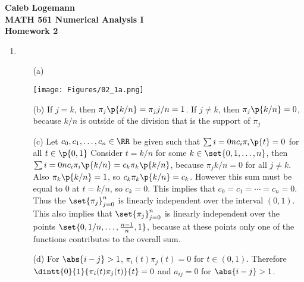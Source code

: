 \documentclass[11pt]{article}
\begin{document}
\noindent \textbf{\Large{Caleb Logemann \\
MATH 561 Numerical Analysis I \\
Homework 2
}}

\begin{enumerate}
    \item
        \begin{enumerate}
            \item[(a)] \hfill \\
                \begin{center}
                    \texttt{[image: Figures/02\_1a.png]}
                \end{center}

            \item[(b)]
                If $j = k$, then $\pi_j\p{k/n} = \pi_j{j/n} = 1$.
                If $j \neq k$, then $\pi_j\p{k/n} = 0$, because $k/n$ is
                outside of the division that is the support of $\pi_j$

            \item[(c)]
                Let $c_0, c_1, \ldots, c_n \in \RR$ be given such that
                $\sum{i=0}{n}{c_i \pi_i\p{t}} = 0$ for all $t \in \p{0,1}$
                Consider $t = k/n$ for some $k \in \set{0, 1, \ldots, n}$, then
                $\sum{i=0}{n}{c_i \pi_i\p{k/n}} = c_k \pi_k\p{k/n}$, because
                $\pi_j{k/n} = 0$ for all $j \neq k$.
                Also $\pi_k\p{k/n} = 1$, so $c_k \pi_k\p{k/n} = c_k$.
                However this sum must be equal to $0$ at $t = k/n$, so $c_k = 0$.
                This implies that $c_0 = c_1 = \cdots = c_n = 0$.
                Thus the $\set{\pi_j}_{j=0}^n$ is linearly independent over the
                interval $(0, 1)$.
                This also implies that $\set{\pi_j}_{j=0}^n$ is linearly independent 
                over the points $\set{0, 1/n, \ldots, \frac{n-1}{n}, 1}$, because
                at these points only one of the functions contributes to the
                overall sum.

            \item[(d)]
                For $\abs{i - j} > 1$, $\pi_i(t) \pi_j(t) = 0$ for $t \in (0, 1)$.
                Therefore $\dintt{0}{1}{\pi_i(t) \pi_j(t)}{t} = 0$ and $a_{ij} = 0$
                for $\abs{i - j} > 1$.


\end{enumerate}
\end{enumerate}
\end{document}

